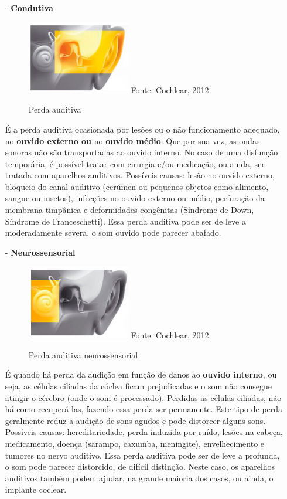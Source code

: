 \documentclass[brasil]{abnt}
\begin{document}
				 \begin{itemize}		
					\item [-] \textbf{Condutiva} 
						\begin{figure}[!htb]
							\caption{Perda auditiva}
							\center
							\includegraphics[width=45mm]{pac.png}
							\center Fonte: Cochlear, 2012
						\end{figure}
						
						É a perda auditiva ocasionada por lesões ou o não funcionamento adequado, no \textbf{ouvido externo ou} no \textbf{ouvido médio}. Que por sua vez, as ondas sonoras não são transportadas ao ouvido interno. 
						No caso de uma disfunção temporária, é possível tratar com cirurgia e/ou medicação, ou ainda, ser tratada com aparelhos auditivos. Possíveis causas: lesão no ouvido externo, bloqueio do canal 
						auditivo (cerúmen ou pequenos objetos como alimento, sangue ou insetos), infecções no ouvido externo ou médio, perfuração da membrana timpânica e deformidades congênitas (Síndrome de Down, 
						Síndrome de Franceschetti). Essa perda auditiva pode ser de leve a moderadamente severa, o som ouvido pode parecer abafado. 

					\item [-] \textbf{Neurossensorial} 
						\begin{figure}[!htb]
							\caption{Perda auditiva neurossensorial}
							\center
							\includegraphics[width=45mm]{pan.png}
							\center Fonte: Cochlear, 2012
						\end{figure}
						
						É quando há perda da audição em função de danos ao \textbf{ouvido interno}, ou seja, as células ciliadas da cóclea ficam prejudicadas e o som não consegue atingir o cérebro (onde o som é processado). 
						Perdidas as células ciliadas, não há como recuperá-las,	fazendo essa perda ser permanente. Este tipo de perda geralmente reduz a audição de sons agudos e pode distorcer alguns sons. Possíveis causas:
						hereditariedade, perda induzida por ruído, lesões na cabeça, medicamento, doença (sarampo, caxumba, meningite), envelhecimento e tumores no nervo auditivo. Essa perda auditiva pode ser de leve a profunda,
						o som pode parecer distorcido, de difícil distinção. Neste caso, os aparelhos auditivos também podem ajudar, na grande maioria dos casos, ou ainda, o implante coclear. 
					

\end{itemize}
\end{document}
